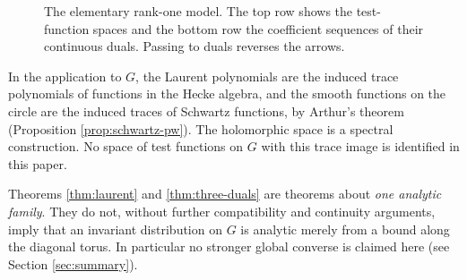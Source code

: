 \begin{figure}[htbp]\centering
{}
\caption{The elementary rank-one model. The top row shows the test-function spaces and the bottom row the coefficient sequences of their continuous duals. Passing to duals reverses the arrows.}\label{fig:three-duals}
\end{figure}

In the application to $G$, the Laurent polynomials are the induced trace polynomials of functions in the Hecke algebra, and the smooth functions on the circle are the induced traces of Schwartz functions, by Arthur's theorem (Proposition \ref{prop:schwartz-pw}). The holomorphic space is a spectral construction. No space of test functions on $G$ with this trace image is identified in this paper.

\begin{remark}[Scope]
Theorems \ref{thm:laurent} and \ref{thm:three-duals} are theorems about \emph{one analytic family}. They do not, without further compatibility and continuity arguments, imply that an invariant distribution on $G$ is analytic merely from a bound along the diagonal torus. In particular no stronger global converse is claimed here (see Section \ref{sec:summary}).
\end{remark}
